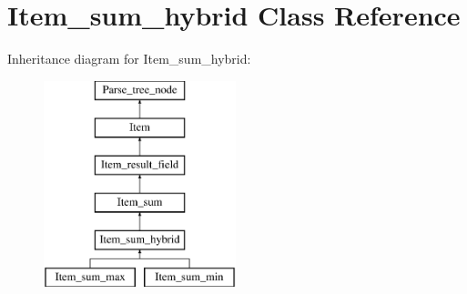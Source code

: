 \hypertarget{classItem__sum__hybrid}{}\section{Item\+\_\+sum\+\_\+hybrid Class Reference}
\label{classItem__sum__hybrid}
Inheritance diagram for Item\+\_\+sum\+\_\+hybrid\+:\begin{figure}[H]
\begin{center}
\leavevmode
\includegraphics[height=6.000000cm]{classItem__sum__hybrid}
\end{center}
\end{figure}
